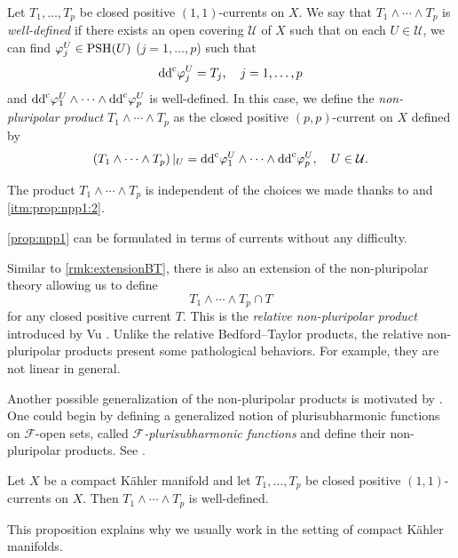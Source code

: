 \begin{definition}\label{def:npp:L146}
Let $T_1,\ldots,T_p$ be closed positive $(1,1)$-currents on $X$. We say that $T_1\wedge\cdots\wedge T_p$ is \emph{well-defined} if there exists an open covering $\mathcal{U}$ of $X$ such that on each $U\in \mathcal{U}$, we can find $\varphi_j^U\in \mathrm{PSH}(U)$ ($j=1,\ldots,p$) such that
\[
\mathrm{dd}^{\mathrm{c}} \varphi_j^U=T_j,\quad j=1,\ldots,p
\]
and $\mathrm{dd}^{\mathrm{c}} \varphi_1^U\wedge \cdots\wedge \mathrm{dd}^{\mathrm{c}} \varphi_p^U$ is well-defined.
In this case, we define the \emph{non-pluripolar product}  $T_1\wedge\cdots\wedge T_p$ as the closed positive $(p,p)$-current on $X$ defined by
\begin{equation}\label{eq:ppp5}
 \left(T_1\wedge\cdots\wedge T_p\right)|_U=\mathrm{dd}^{\mathrm{c}} \varphi_1^U\wedge \cdots\wedge \mathrm{dd}^{\mathrm{c}} \varphi_p^U,\quad U\in \mathcal{U}.
\end{equation}
\end{definition}
The product $T_1\wedge\cdots\wedge T_p$ is independent of the choices we made thanks to  and \ref{itm:prop:npp1:2}.

\cref{prop:npp1} can be formulated in terms of currents without any difficulty.

\begin{remark}\label{rmk:npp:L161}
    Similar to \cref{rmk:extensionBT}, there is also an extension of the non-pluripolar theory allowing us to define
    \[
    T_1\wedge \cdots \wedge T_p\cap T
    \]
    for any closed positive current $T$. This is the \emph{relative non-pluripolar product} introduced by Vu \cite{Vu20}. Unlike the relative Bedford--Taylor products, the relative non-pluripolar products present some pathological behaviors. For example, they are not linear in general.
\end{remark}

\begin{remark}\label{rmk:npp:L169}
    Another possible generalization of the non-pluripolar products is motivated by . One could begin by defining a generalized notion of plurisubharmonic functions on $\mathcal{F}$-open sets, called \emph{$\mathcal{F}$-plurisubharmonic functions} and define their non-pluripolar products. See \cite{EKFW11, EKW14}.
\end{remark}

\begin{proposition}\label{prop:nppwelldef}
    Let $X$ be a compact Kähler manifold and let $T_1,\ldots,T_p$ be closed positive $(1,1)$-currents on $X$. Then $T_1\wedge \cdots\wedge T_p$ is well-defined.
\end{proposition}
This proposition explains why we usually work in the setting of compact Kähler manifolds.

